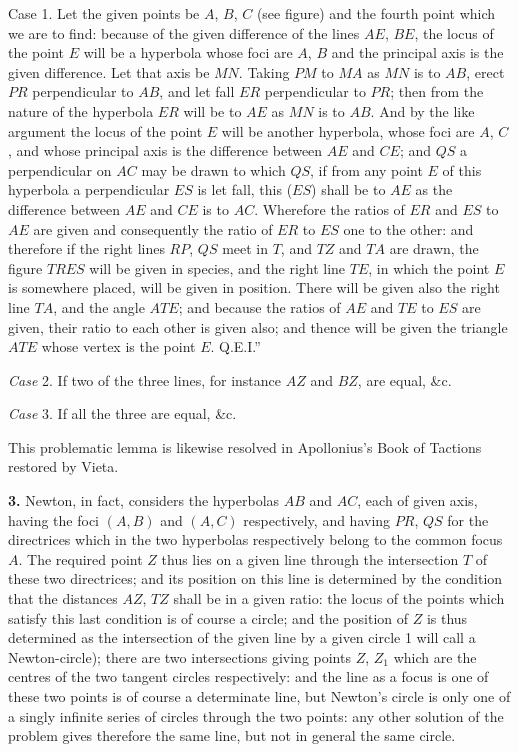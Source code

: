 \documentclass[11pt,a4paper]{article}
\begin{document}
Case 1. Let the given points be $A$, $B$, $C$ (see figure) and the fourth point which we are to find: because of the given difference of the lines $AE$, $BE$, the locus of the point $E$ will be a hyperbola whose foci are $A$, $B$ and the principal axis is the given difference. Let that axis be $MN$. Taking $PM$ to $MA$ as $MN$ is to $AB$, erect $PR$ perpendicular to $AB$, and let fall $ER$ perpendicular to $PR$; then from the nature of the hyperbola $ER$ will be to $AE$ as $MN$ is to $AB$. And by the like argument the locus of the point $E$ will be another hyperbola, whose foci are $A$, $C$, and whose principal axis is the difference between $AE$ and $CE$; and $QS$ a perpendicular on $AC$ may be drawn to which $QS$, if from any point $E$ of this hyperbola a perpendicular $ES$ is let fall, this ($ES$) shall be to $AE$ as the difference between $AE$ and $CE$ is to $AC$. Wherefore the ratios of $ER$ and $ES$ to $AE$ are given and consequently the ratio of $ER$ to $ES$ one to the other: and therefore if the right lines $RP$, $QS$ meet in $T$, and $TZ$ and $TA$ are drawn, the figure $TRES$ will be given in species, and the right line $TE$, in which the point $E$ is somewhere placed, will be given in position. There will be given also the right line $TA$, and the angle $ATE$; and because the ratios of $AE$ and $TE$ to $ES$ are given, their ratio to each other is given also; and thence will be given the triangle $ATE$ whose vertex is the point $E$. \hspace*{\fill} Q.E.I.''

\vspace{0.5em}
\textit{Case} 2. If two of the three lines, for instance $AZ$ and $BZ$, are equal, \&c.

\textit{Case} 3. If all the three are equal, \&c.

This problematic lemma is likewise resolved in Apollonius's Book of Tactions restored by Vieta.

\textbf{3.} Newton, in fact, considers the hyperbolas $AB$ and $AC$, each of given axis, having the foci $(A, B)$ and $(A, C)$ respectively, and having $PR$, $QS$ for the directrices which in the two hyperbolas respectively belong to the common focus $A$. The required point $Z$ thus lies on a given line through the intersection $T$ of these two directrices; and its position on this line is determined by the condition that the distances $AZ$, $TZ$ shall be in a given ratio: the locus of the points which satisfy this last condition is of course a circle; and the position of $Z$ is thus determined as the intersection of the given line by a given circle 1 will call a Newton-circle); there are two intersections giving points $Z$, $Z_1$ which are the centres of the two tangent circles respectively: and the line as a focus is one of these two points is of course a determinate line, but Newton's circle is only one of a singly infinite series of circles through the two points: any other solution of the problem gives therefore the same line, but not in general the same circle.
\end{document}
